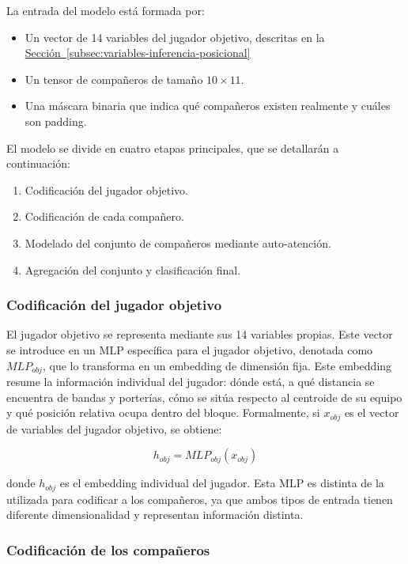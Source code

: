 La entrada del modelo está formada por:

\begin{itemize}
    \item Un vector de 14 variables del jugador objetivo, descritas en la  \hyperref[subsec:variables-inferencia-posicional]{Sección~\ref*{subsec:variables-inferencia-posicional}}
    \item Un tensor de compañeros de tamaño $10 \times 11$.
    \item Una máscara binaria que indica qué compañeros existen realmente y cuáles son padding.
\end{itemize}

El modelo se divide en cuatro etapas principales, que se detallarán a continuación:

\begin{enumerate}
    \item Codificación del jugador objetivo.
    \item Codificación de cada compañero.
    \item Modelado del conjunto de compañeros mediante auto-atención.
    \item Agregación del conjunto y clasificación final.
\end{enumerate}

\subsubsection{Codificación del jugador objetivo}

El jugador objetivo se representa mediante sus 14 variables propias. Este vector se introduce en un MLP específica para el jugador objetivo, denotada como $MLP_{obj}$, que lo transforma en un embedding de dimensión fija. Este embedding resume la información individual del jugador: dónde está, a qué distancia se encuentra de bandas y porterías, cómo se sitúa respecto al centroide de su equipo y qué posición relativa ocupa dentro del bloque. Formalmente, si $x_{obj}$ es el vector de variables del jugador objetivo, se obtiene:

\[
h_{obj} = MLP_{obj}(x_{obj})
\]

donde $h_{obj}$ es el embedding individual del jugador. Esta MLP es distinta de la utilizada para codificar a los compañeros, ya que ambos tipos de entrada tienen diferente dimensionalidad y representan información distinta.

\subsubsection{Codificación de los compañeros}

